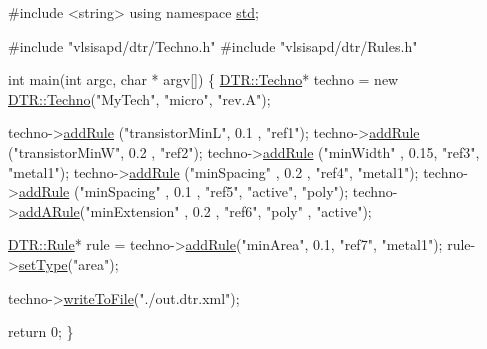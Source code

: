 \begin{DoxyCodeInclude}
\textcolor{preprocessor}{#include <string>}
\textcolor{keyword}{using namespace }\mbox{\hyperlink{namespacestd}{std}};

\textcolor{preprocessor}{#include "vlsisapd/dtr/Techno.h"}
\textcolor{preprocessor}{#include "vlsisapd/dtr/Rules.h"}

\textcolor{keywordtype}{int} main(\textcolor{keywordtype}{int} argc, \textcolor{keywordtype}{char} * argv[]) \{
    \mbox{\hyperlink{class_d_t_r_1_1_techno}{DTR::Techno}}* techno = \textcolor{keyword}{new} \mbox{\hyperlink{class_d_t_r_1_1_techno}{DTR::Techno}}(\textcolor{stringliteral}{"MyTech"}, \textcolor{stringliteral}{"micro"}, \textcolor{stringliteral}{"rev.A"});

    techno->\mbox{\hyperlink{class_d_t_r_1_1_techno_afa2c8412c365c950649b9f81661ecafd}{addRule}} (\textcolor{stringliteral}{"transistorMinL"}, 0.1 , \textcolor{stringliteral}{"ref1"});
    techno->\mbox{\hyperlink{class_d_t_r_1_1_techno_afa2c8412c365c950649b9f81661ecafd}{addRule}} (\textcolor{stringliteral}{"transistorMinW"}, 0.2 , \textcolor{stringliteral}{"ref2"});
    techno->\mbox{\hyperlink{class_d_t_r_1_1_techno_afa2c8412c365c950649b9f81661ecafd}{addRule}} (\textcolor{stringliteral}{"minWidth"}      , 0.15, \textcolor{stringliteral}{"ref3"}, \textcolor{stringliteral}{"metal1"});
    techno->\mbox{\hyperlink{class_d_t_r_1_1_techno_afa2c8412c365c950649b9f81661ecafd}{addRule}} (\textcolor{stringliteral}{"minSpacing"}    , 0.2 , \textcolor{stringliteral}{"ref4"}, \textcolor{stringliteral}{"metal1"});
    techno->\mbox{\hyperlink{class_d_t_r_1_1_techno_afa2c8412c365c950649b9f81661ecafd}{addRule}} (\textcolor{stringliteral}{"minSpacing"}    , 0.1 , \textcolor{stringliteral}{"ref5"}, \textcolor{stringliteral}{"active"}, \textcolor{stringliteral}{"poly"});
    techno->\mbox{\hyperlink{class_d_t_r_1_1_techno_a5f5a790974fe7d3b1c6f1b698ef0a818}{addARule}}(\textcolor{stringliteral}{"minExtension"}  , 0.2 , \textcolor{stringliteral}{"ref6"}, \textcolor{stringliteral}{"poly"}  , \textcolor{stringliteral}{"active"});
    
    \mbox{\hyperlink{class_d_t_r_1_1_rule}{DTR::Rule}}* rule = techno->\mbox{\hyperlink{class_d_t_r_1_1_techno_afa2c8412c365c950649b9f81661ecafd}{addRule}}(\textcolor{stringliteral}{"minArea"}, 0.1, \textcolor{stringliteral}{"ref7"}, \textcolor{stringliteral}{"metal1"});
    rule->\mbox{\hyperlink{class_d_t_r_1_1_rule_a3568407d7a7890c39b8c9acc1e608535}{setType}}(\textcolor{stringliteral}{"area"});

    techno->\mbox{\hyperlink{class_d_t_r_1_1_techno_a26b05539dd3345963b8708788b82e2cb}{writeToFile}}(\textcolor{stringliteral}{"./out.dtr.xml"});
    
    \textcolor{keywordflow}{return} 0;
\}

\end{DoxyCodeInclude}


